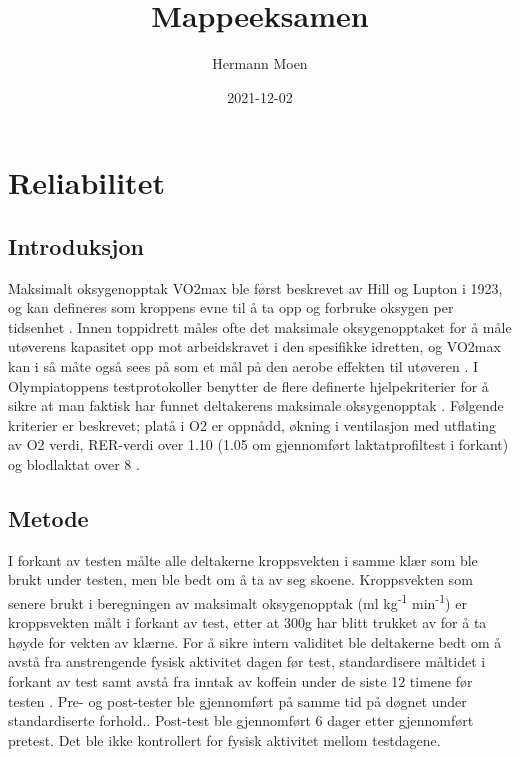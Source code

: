 \documentclass[
]{book}
\title{Mappeeksamen}
\author{Hermann Moen}
\date{2021-12-02}
\begin{document}
\maketitle

{
\setcounter{tocdepth}{1}
\tableofcontents
}
\hypertarget{reliabilitet}{%
\chapter{Reliabilitet}\label{reliabilitet}}

\hypertarget{introduksjon}{%
\section{Introduksjon}\label{introduksjon}}

Maksimalt oksygenopptak VO2max ble først beskrevet av Hill og Lupton i 1923, og kan defineres som kroppens evne til å ta opp og forbruke oksygen per tidsenhet \citep{bassett2000, hill1923}. Innen toppidrett måles ofte det maksimale oksygenopptaket for å måle utøverens kapasitet opp mot arbeidskravet i den spesifikke idretten, og VO2max kan i så måte også sees på som et mål på den aerobe effekten til utøveren \citep{bassett2000}. I Olympiatoppens testprotokoller benytter de flere definerte hjelpekriterier for å sikre at man faktisk har funnet deltakerens maksimale oksygenopptak \citep{tønnessen2017}. Følgende kriterier er beskrevet; platå i O2 er oppnådd, økning i ventilasjon med utflating av O2 verdi, RER-verdi over 1.10 (1.05 om gjennomført laktatprofiltest i forkant) og blodlaktat over 8 \citep{tønnessen2017}.

\hypertarget{metode}{%
\section{Metode}\label{metode}}

I forkant av testen målte alle deltakerne kroppsvekten i samme klær som ble brukt under testen, men ble bedt om å ta av seg skoene. Kroppsvekten som senere brukt i beregningen av maksimalt oksygenopptak (ml kg\textsuperscript{-1} min\textsuperscript{-1}) er kroppsvekten målt i forkant av test, etter at 300g har blitt trukket av for å ta høyde for vekten av klærne. For å sikre intern validitet ble deltakerne bedt om å avstå fra anstrengende fysisk aktivitet dagen før test, standardisere måltidet i forkant av test samt avstå fra inntak av koffein under de siste 12 timene før testen \citep{halperin2015} . Pre- og post-tester ble gjennomført på samme tid på døgnet under standardiserte forhold.. Post-test ble gjennomført 6 dager etter gjennomført pretest. Det ble ikke kontrollert for fysisk aktivitet mellom testdagene.
\end{document}
